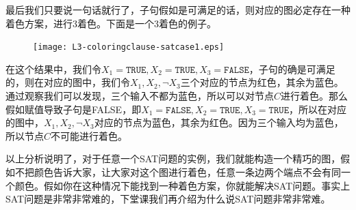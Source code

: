 最后我们只要说一句话就行了，子句假如是可满足的话，则对应的图必定存在一种着色方案，进行3着色。下面是一个3着色的例子。

 \begin{figure}[H]
 \centering
  \texttt{[image: L3-coloringclause-satcase1.eps]}
 \end{figure}

在这个结果中，我们令$X_1 = \texttt{TRUE},X_2 = \texttt{TRUE},X_3 = \texttt{FALSE}$，子句的确是可满足的，则在对应的图中，我们令$X_1,X_2,\neg X_3$三个对应的节点为红色，其余为蓝色。通过观察我们可以发现，三个输入不都为蓝色，所以可以对节点$C$进行着色。那么假如赋值导致子句是FALSE，即$X_1 = \texttt{FALSE},X_2 = \texttt{TRUE},X_3 = \texttt{TRUE}$，所以在对应的图中，$X_1,X_2,\neg X_3$对应的节点为蓝色，其余为红色。因为三个输入均为蓝色，所以节点$C$不可能进行着色。

以上分析说明了，对于任意一个SAT问题的实例，我们就能构造一个精巧的图，假如不把颜色告诉大家，让大家对这个图进行着色，任意一条边两个端点不会有同一个颜色。假如你在这种情况下能找到一种着色方案，你就能解决SAT问题。事实上SAT问题是非常非常难的，下堂课我们再介绍为什么说SAT问题非常非常难。

%